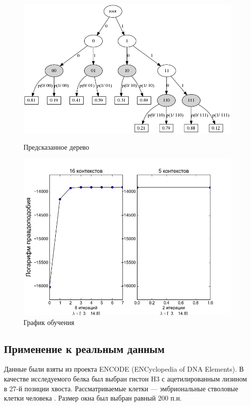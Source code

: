\documentclass{matmex-diploma-custom}
\begin{document}
\begin{enumerate}
\begin{figure}[h!]
\begin{minipage}[b]{0.49 \textwidth}
\end{minipage}
\hfil \hfil%
\begin{minipage}[b]{0.49 \textwidth}
	\includegraphics[scale=0.3]{img/sample/predicted_trie.png}
	\centering
	\caption{ Предсказанное дерево }
	\label{ris:sample_predicted_trie}
\end{minipage}
\begin{minipage}[b]{0.8 \textwidth}
	\includegraphics[scale=0.4]{img/sample/plot_.png}
	\centering
	\caption{ График обучения }
	\label{ris:sample_log_likelihood}
\end{minipage}
\end{figure}
\end{enumerate}

\subsection{Применение к реальным данным}
Данные были взяты из проекта ENCODE (ENCyclopedia of DNA Elements).
В качестве исследуемого белка был выбран гистон H3 с ацетилированным лизином в 27-й позиции хвоста. Рассматриваемые клетки --- эмбриональные стволовые клетки человека \cite{ENCODE}.
Размер окна был выбран равный 200 п.н.
\end{document}
